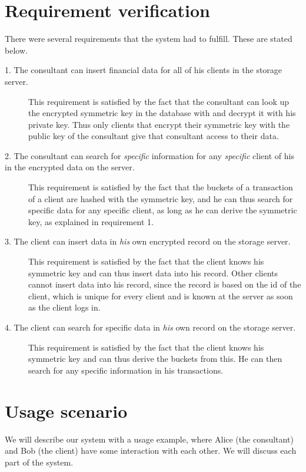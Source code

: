 \documentclass[a4paper]{article}
\begin{document}
\section{Requirement verification}
	There were several requirements that the system had to fulfill. These are stated below. 
	\begin{description}
    	\item[1. The consultant can insert financial data for all of his clients in the storage server.] This requirement is satisfied by the fact that the consultant can look up the encrypted symmetric key in the database with and decrypt it with his private key. Thus only clients that encrypt their symmetric key with the public key of the consultant give that consultant access to their data. 
        \item[2. The consultant can search for \textit{specific} information for any \textit{specific} client of his in the encrypted data on the server.] This requirement is satisfied by the fact that the buckets of a transaction of a client are hashed with the symmetric key, and he can thus search for specific data for any specific client, as long as he can derive the symmetric key, as explained in requirement 1.
        \item[3. The client can insert data in \textit{his} own encrypted record on the storage server.] This requirement is satisfied by the fact that the client knows his symmetric key and can thus insert data into his record. Other clients cannot insert data into his record, since the record is based on the id of the client, which is unique for every client and is known at the server as soon as the client logs in.
        \item[4. The client can search for specific data in \textit{his} own record on the storage server.] This requirement is satisfied by the fact that the client knows his symmetric key and can thus derive the buckets from this. He can then search for any specific information in his transactions. 
    \end{description}

\section{Usage scenario}

	We will describe our system with a usage example, where Alice (the consultant) and Bob (the client) have some interaction with each other. We will discuss each part of the system. 
    
\end{document}
